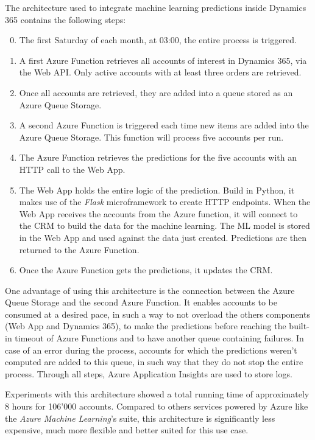 The architecture used to integrate machine learning predictions inside Dynamics 365 contains the following steps:
\vspace*{-\baselineskip}
\begin{enumerate}[label=\texttt{\arabic*.}]
    \setcounter{enumi}{-1}
    \item The first Saturday of each month, at 03:00, the entire process is triggered.
    \item A first Azure Function retrieves all accounts of interest in Dynamics 365, via the Web API. Only active accounts with at least three orders are retrieved.
    \item Once all accounts are retrieved, they are added into a queue stored as an Azure Queue Storage.
    \item A second Azure Function is triggered each time new items are added into the Azure Queue Storage. This function will process five accounts per run.
    \item The Azure Function retrieves the predictions for the five accounts with an HTTP call to the Web App.
    \item The Web App holds the entire logic of the prediction. Build in Python, it makes use of the \textit{Flask} microframework to create HTTP endpoints. When the Web App receives the accounts from the Azure function, it will connect to the CRM to build the data for the machine learning. The ML model is stored in the Web App and used against the data just created. Predictions are then returned to the Azure Function.
    \item Once the Azure Function gets the predictions, it updates the CRM.
\end{enumerate}

One advantage of using this architecture is the connection between the Azure Queue Storage and the second Azure Function. It enables accounts to be consumed at a desired pace, in such a way to not overload the others components (Web App and Dynamics 365), to make the predictions before reaching the built-in timeout of Azure Functions and to have another queue containing failures. In case of an error during the process, accounts for which the predictions weren't computed are added to this queue, in such way that they do not stop the entire process. Through all steps, Azure Application Insights are used to store logs.

Experiments with this architecture showed a total running time of approximately 8 hours for 106'000 accounts. Compared to others services powered by Azure like the \textit{Azure Machine Learning}'s suite, this architecture is significantly less expensive, much more flexible and better suited for this use case.

